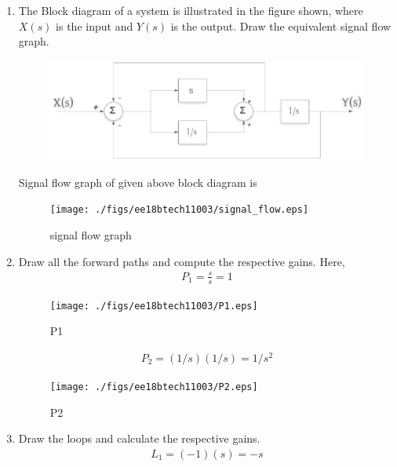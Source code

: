 \begin{enumerate}[label=\thesection.\arabic*.,ref=\thesection.\theenumi]

\item The Block diagram of a system is illustrated in the figure shown, where $X(s)$ is the input and $Y(s)$ is the output. Draw the equivalent signal flow graph.
\renewcommand{\thefigure}{\theenumi.\arabic{figure}}

\begin{figure}[!ht]
\centering
\includegraphics[width=\columnwidth]{./figs/ee18btech11003/pic1.eps}
\caption{}
\label{fig:sec_order}
\end{figure}
\solution
Signal flow graph of given above block diagram is
\begin{figure}[!ht]
\centering
\texttt{[image: ./figs/ee18btech11003/signal\_flow.eps]}
\caption{signal flow graph}
\label{fig:sec_order}
\end{figure}
%
\renewcommand{\thefigure}{\theenumi}
\item Draw all the forward paths and compute the respective gains.
\renewcommand{\thefigure}{\theenumi.\arabic{figure}}
\solution
Here, 
\begin{align}
P_1=\frac{s}{s}=1
\end{align}

\begin{figure}[!ht]
\centering
\texttt{[image: ./figs/ee18btech11003/P1.eps]}
\caption{P1}
\label{fig:sec_order}
\end{figure}

 
\begin{align}
P_2=(1/s)(1/s)=1/s^2
\end{align}

\begin{figure}[!ht]
\centering
\texttt{[image: ./figs/ee18btech11003/P2.eps]}
\caption{P2}
\label{fig:sec_order}
\end{figure}
\renewcommand{\thefigure}{\theenumi}

\item Draw the loops and calculate the respective gains.\renewcommand{\thefigure}{\theenumi.\arabic{figure}}
\\
\solution 
\begin{align}
L_1=(-1)(s)=-s
\end{align}


\end{enumerate}
